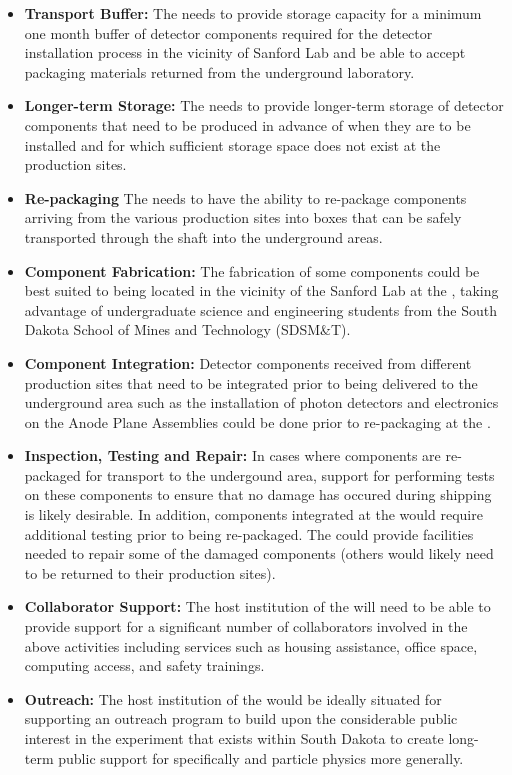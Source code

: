 \begin{itemize}
  \item {\bf Transport Buffer:} The  needs to provide
    storage capacity for a minimum one month buffer of detector
    components required for the detector installation process in the
    vicinity of Sanford Lab and be able to accept packaging materials
    returned from the underground laboratory.
  \item {\bf Longer-term Storage:} The  needs to provide
    longer-term storage of detector components that need to be
    produced in advance of when they are to be installed and for which
    sufficient storage space does not exist at the production sites.
  \item {\bf Re-packaging} The  needs to have the ability
    to re-package components arriving from the various production
    sites into boxes that can be safely transported through the shaft
    into the underground areas.
  \item {\bf Component Fabrication:} The fabrication of some
    components could be best suited to being located in the vicinity
    of the Sanford Lab at the , taking advantage of
    undergraduate science and engineering students from the South
    Dakota School of Mines and Technology (SDSM\&T).
  \item {\bf Component Integration:} Detector components received from 
    different production sites that need to be integrated prior to being 
    delivered to the underground area such as the installation of photon 
    detectors and electronics on the Anode Plane Assemblies could be done
    prior to re-packaging at the .    
  \item {\bf Inspection, Testing and Repair:} In cases where
    components are re-packaged for transport to the undergound area,
     support for performing tests on these components to
    ensure that no damage has occured during shipping is likely
    desirable.  In addition, components integrated at the 
    would require additional testing prior to being re-packaged.  The
     could provide facilities needed to repair some of the
    damaged components (others would likely need to be returned to
    their production sites).
  \item {\bf Collaborator Support:} The host institution of the 
    will need to be able to provide support for a significant number
    of  collaborators involved in the above activities
    including services such as housing assistance, office space,
    computing access, and safety trainings.
  \item {\bf Outreach:} The host institution of the  would be
    ideally situated for supporting an outreach program to build upon
    the considerable public interest in the experiment that exists
    within South Dakota to create long-term public support for
     specifically and particle physics more generally.
\end{itemize}

